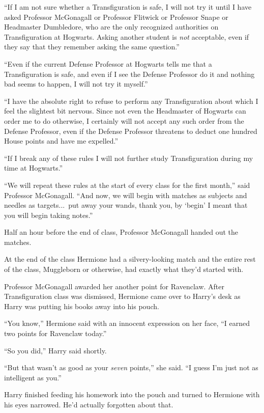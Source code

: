 “If I am not sure whether a Transfiguration is safe, I will not try it until I have asked Professor McGonagall or Professor Flitwick or Professor Snape or Headmaster Dumbledore, who are the only recognized authorities on Transfiguration at Hogwarts. Asking another student is \emph{not} acceptable, even if they say that they remember asking the same question.”

“Even if the current Defense Professor at Hogwarts tells me that a Transfiguration is safe, and even if I see the Defense Professor do it and nothing bad seems to happen, I will not try it myself.”

“I have the absolute right to refuse to perform any Transfiguration about which I feel the slightest bit nervous. Since not even the Headmaster of Hogwarts can order me to do otherwise, I certainly will not accept any such order from the Defense Professor, even if the Defense Professor threatens to deduct one hundred House points and have me expelled.”

“If I break any of these rules I will not further study Transfiguration during my time at Hogwarts.”

“We will repeat these rules at the start of every class for the first month,” said Professor McGonagall. “And now, we will begin with matches as subjects and needles as targets...\ put away your wands, thank you, by ‘begin’ I meant that you will begin taking notes.”

Half an hour before the end of class, Professor McGonagall handed out the matches.

At the end of the class Hermione had a silvery-looking match and the entire rest of the class, Muggleborn or otherwise, had exactly what they’d started with.

Professor McGonagall awarded her another point for Ravenclaw.
\sbreak
After Transfiguration class was dismissed, Hermione came over to Harry’s desk as Harry was putting his books away into his pouch.

“You know,” Hermione said with an innocent expression on her face, “I earned two points for Ravenclaw today.”

“So you did,” Harry said shortly.

“But that wasn’t as good as your \emph{seven} points,” she said. “I guess I’m just not as intelligent as you.”

Harry finished feeding his homework into the pouch and turned to Hermione with his eyes narrowed. He’d actually forgotten about that.

